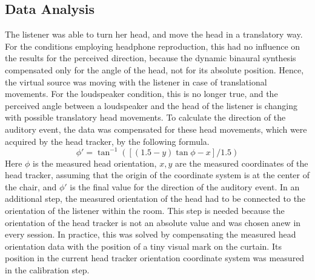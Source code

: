 \subsection{Data Analysis}
%
The listener was able to turn her head, and move the head
in a translatory way. For the conditions employing
headphone reproduction, this had no influence on the results for the perceived
direction, because the dynamic binaural synthesis compensated only for the angle
of the head, not for its absolute position. Hence, the virtual source was moving with
the listener in case of translational movements.
For the loudspeaker condition, this is no
longer true, and the perceived angle between a loudspeaker and the head of
the listener is changing with possible translatory head movements.
To calculate the direction of the auditory event, the data was
compensated for these head movements, which were acquired by the head tracker,
by the following formula.
\begin{equation}
    \phi' = \tan^{-1}\left( [ (1.5-y) \tan\phi - x ] / 1.5 \right)
\end{equation} 
Here $\phi$ is the measured head orientation, $x,y$ are the measured 
coordinates of the head tracker, assuming that the origin of the coordinate
system is at the center of the chair, and $\phi'$ is the final value for the
direction of the auditory event.
In an additional step, the measured orientation of the head had to be connected
to the orientation of the listener within the room. This step is needed
because the orientation of the head tracker is not an absolute value and was
chosen anew in every session.
In practice, this was solved by compensating
the measured head orientation data with the position of a tiny visual mark on
the curtain. Its position in the current head tracker orientation coordinate
system was measured in the calibration step.


